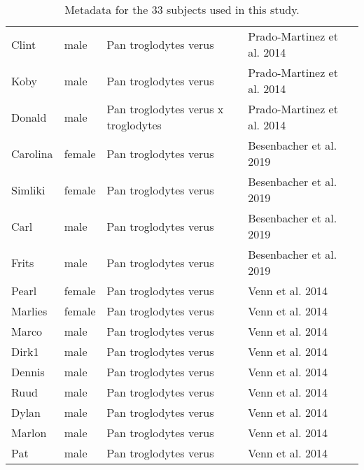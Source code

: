\begin{table}[h]
\begin{tabular}{|l|l|l|l|}
Clint  &  male  &  Pan troglodytes verus  & Prado-Martinez et al. 2014  \\
Koby  &  male  &  Pan troglodytes verus  & Prado-Martinez et al. 2014  \\
Donald  &  male  &  Pan troglodytes verus x troglodytes & Prado-Martinez et al. 2014  \\
Carolina  &  female  &  Pan troglodytes verus  & Besenbacher et al. 2019  \\
Simliki  &  female  &  Pan troglodytes verus  & Besenbacher et al. 2019  \\
Carl  &  male  &  Pan troglodytes verus  & Besenbacher et al. 2019  \\
Frits  &  male  &  Pan troglodytes verus  & Besenbacher et al. 2019  \\
Pearl  &  female  &  Pan troglodytes verus  & Venn et al. 2014  \\
Marlies  &  female  &  Pan troglodytes verus  & Venn et al. 2014  \\
Marco  &  male  &  Pan troglodytes verus  & Venn et al. 2014  \\
Dirk1  &  male  &  Pan troglodytes verus  & Venn et al. 2014  \\
Dennis  &  male  &  Pan troglodytes verus  & Venn et al. 2014  \\
Ruud  &  male  &  Pan troglodytes verus  & Venn et al. 2014  \\
Dylan  &  male  &  Pan troglodytes verus  & Venn et al. 2014  \\
Marlon  &  male  &  Pan troglodytes verus  & Venn et al. 2014  \\
Pat  &  male  &  Pan troglodytes verus  & Venn et al. 2014 \\
\hline

\end{tabular}
\caption{\label{tab:subjects}Metadata for the 33 subjects used in this study.}
\end{table}

